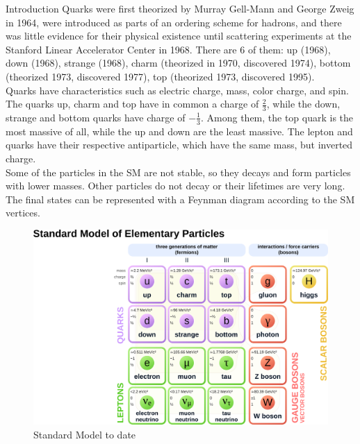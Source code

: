 \begin{chapter}{Introduction}
Quarks were first theorized by Murray Gell-Mann and 
George Zweig in 1964, were introduced as parts of an ordering scheme for hadrons, and there was little evidence for their physical existence until scattering experiments at the Stanford Linear Accelerator Center in 1968\cite{griff}.
There are 6 of them: up (1968), down (1968), strange (1968), charm (theorized in 1970, discovered 1974), bottom (theorized 1973, discovered 1977), top (theorized 1973, discovered 1995).
\\

Quarks have characteristics such as electric charge, mass, color charge, and spin. The quarks up, charm and top have in common a charge of $\frac{2}{3}$, while the down, strange and bottom quarks have charge of $-\frac{1}{3}$. Among them, the top quark is the most massive of all, while the up and down are the least massive. 
The lepton and quarks have their respective antiparticle, which have the same mass, but inverted charge.\\ 
Some of the particles in the SM are not stable, so they decays and form particles with lower masses. Other particles do not decay or their lifetimes are very long. The final states can be represented with a Feynman diagram according to the SM vertices\cite{mark}.

\begin{center}
  \begin{figure}[!htbp]
    \centering
    \includegraphics[scale=0.3]{Chapter1/sm1.png}
    \caption{Standard Model to date \protect \footnotemark}
    \label{sm1}
  \end{figure}
\end{center}


\end{chapter}
